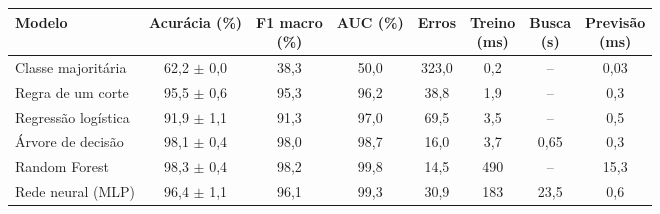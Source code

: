 \setlength{\tabcolsep}{4pt}
\begin{tabular}{lccccccc}
\toprule
Modelo & Acurácia (\%) & \shortstack{F1 macro\\(\%)} & AUC (\%) & Erros &\shortstack{Treino\\(ms)} & \shortstack{Busca\\(s)} & \shortstack{Previsão\\(ms)} \\
\midrule
Classe majoritária & 62,2 $\pm$ 0,0 & 38,3 & 50,0 & 323,0 & 0,2 & -- & 0,03 \\
Regra de um corte & 95,5 $\pm$ 0,6 & 95,3 & 96,2 & 38,8 & 1,9 & -- & 0,3 \\
Regressão logística & 91,9 $\pm$ 1,1 & 91,3 & 97,0 & 69,5 & 3,5 & -- & 0,5 \\
Árvore de decisão & 98,1 $\pm$ 0,4 & 98,0 & 98,7 & 16,0 & 3,7 & 0,65 & 0,3 \\
Random Forest & 98,3 $\pm$ 0,4 & 98,2 & 99,8 & 14,5 & 490 & -- & 15,3 \\
Rede neural (MLP) & 96,4 $\pm$ 1,1 & 96,1 & 99,3 & 30,9 & 183 & 23,5 & 0,6 \\
\bottomrule
\end{tabular}
